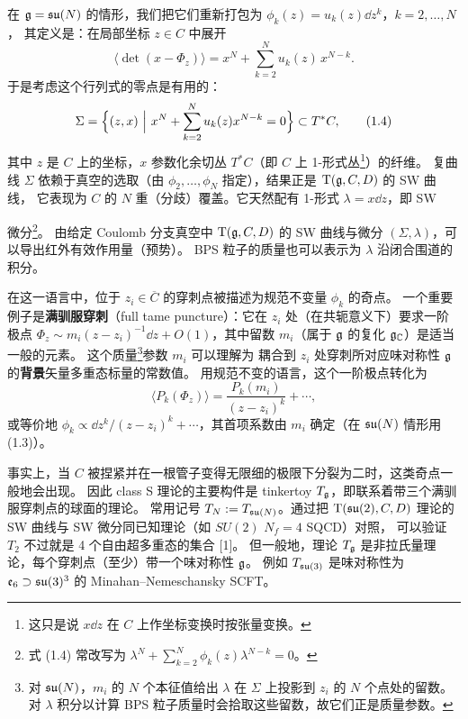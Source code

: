 在 $\mathfrak{g}=\mathfrak{su}(N)$ 的情形，我们把它们重新打包为 $\phi_k(z)=u_k(z)\dd z^k$，$k=2,\dots,N$，
其定义是：在局部坐标 $z\in C$ 中展开
\begin{equation}
  \langle \det(x-\Phi_z) \rangle
  = x^N + \sum_{k=2}^{N} u_k(z)\, x^{N-k}.
  \tag{1.3}
\end{equation}
于是考虑这个行列式的零点是有用的：
\begin{equation}
  \Sigma=\Bigl\{(z,x)\ \Big|\ x^N+\sum_{k=2}^{N}u_k(z)x^{N-k}=0\Bigr\}\subset T^*C,
  \tag{1.4}
\end{equation}
其中 $z$ 是 $C$ 上的坐标，$x$ 参数化余切丛 $T^*C$（即 $C$ 上 1-形式丛\footnote{这只是说 $x\dd z$ 在 $C$ 上作坐标变换时按张量变换。}）的纤维。
复曲线 $\Sigma$ 依赖于真空的选取（由 $\phi_2,\dots,\phi_N$ 指定），结果正是 $\mathrm{T}(\mathfrak{g},C,D)$ 的 SW 曲线，
它表现为 $C$ 的 $N$ 重（分歧）覆盖。它天然配有 1-形式 $\lambda=x\dd z$，即 SW

微分\footnote{式 (1.4) 常改写为 $\lambda^N+\sum_{k=2}^{N}\phi_k(z)\lambda^{N-k}=0$。}。
由给定 Coulomb 分支真空中 $\mathrm{T}(\mathfrak{g},C,D)$ 的 SW 曲线与微分 $(\Sigma,\lambda)$，可以导出红外有效作用量（预势）。
BPS 粒子的质量也可以表示为 $\lambda$ 沿闭合围道的积分。

在这一语言中，位于 $z_i\in\overline{C}$ 的穿刺点被描述为规范不变量 $\phi_k$ 的奇点。
一个重要例子是\textbf{满驯服穿刺}（full tame puncture）：它在 $z_i$ 处（在共轭意义下）要求一阶极点
$\Phi_z\sim m_i(z-z_i)^{-1}\dd z+O(1)$，其中留数 $m_i$（属于 $\mathfrak{g}$ 的复化 $\mathfrak{g}_{\mathbb{C}}$）是适当一般的元素。
这个质量\footnote{对 $\mathfrak{su}(N)$，$m_i$ 的 $N$ 个本征值给出 $\lambda$ 在 $\Sigma$ 上投影到 $z_i$ 的 $N$ 个点处的留数。
对 $\lambda$ 积分以计算 BPS 粒子质量时会拾取这些留数，故它们正是质量参数。}参数 $m_i$ 可以理解为
耦合到 $z_i$ 处穿刺所对应味对称性 $\mathfrak{g}$ 的\textbf{背景}矢量多重态标量的常数值。
用规范不变的语言，这个一阶极点转化为
\begin{equation}
  \langle P_k(\Phi_z)\rangle = \frac{P_k(m_i)}{(z-z_i)^k}+\cdots,
  \tag{1.5}
\end{equation}
或等价地 $\phi_k\propto \dd z^k/(z-z_i)^k+\cdots$，其首项系数由 $m_i$ 确定（在 $\mathfrak{su}(N)$ 情形用 (1.3)）。

事实上，当 $C$ 被捏紧并在一根管子变得无限细的极限下分裂为二时，这类奇点一般地会出现。
因此 class S 理论的主要构件是 tinkertoy $T_{\mathfrak{g}}$，即联系着带三个满驯服穿刺点的球面的理论。
常用记号 $T_N:=T_{\mathfrak{su}(N)}$。通过把 $\mathrm{T}(\mathfrak{su}(2),C,D)$ 理论的 SW 曲线与 SW 微分同已知理论（如 $SU(2)$ $N_f=4$ SQCD）对照，
可以验证 $T_2$ 不过就是 4 个自由超多重态的集合 [1]。
但一般地，理论 $T_{\mathfrak{g}}$ 是非拉氏量理论，每个穿刺点（至少）带一个味对称性 $\mathfrak{g}$。
例如 $T_{\mathfrak{su}(3)}$ 是味对称性为 $\mathfrak{e}_6\supset\mathfrak{su}(3)^3$ 的 Minahan--Nemeschansky SCFT。

